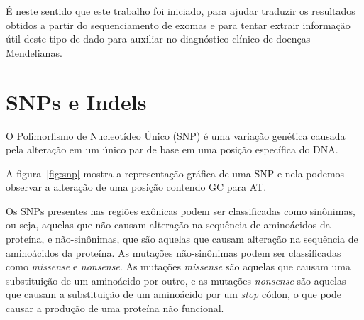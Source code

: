 É neste sentido que este trabalho foi iniciado, para ajudar traduzir os resultados obtidos a partir do sequenciamento de exomas e para tentar extrair informação útil deste tipo de dado para auxiliar no diagnóstico clínico de doenças Mendelianas.

\section{SNPs e Indels}

O Polimorfismo de Nucleotídeo Único (SNP) é uma variação genética causada pela alteração em um único par de base em uma posição específica do DNA.

A figura~\ref{fig:snp} mostra a representação gráfica de uma SNP e nela podemos observar a alteração de uma posição contendo GC para AT.

Os SNPs presentes nas regiões exônicas podem ser classificadas como sinônimas, ou seja, aquelas que não causam alteração na sequência de aminoácidos da proteína, e não-sinônimas, que são aquelas que causam alteração na sequência de aminoácidos da proteína. As mutações não-sinônimas podem ser classificadas como \textit{missense} e \textit{nonsense}. As mutações \textit{missense} são aquelas que causam uma substituição de um aminoácido por outro, e as mutações \textit{nonsense} são aquelas que causam a substituição de um aminoácido por um \textit{stop} códon, o que pode causar a produção de uma proteína não funcional.


